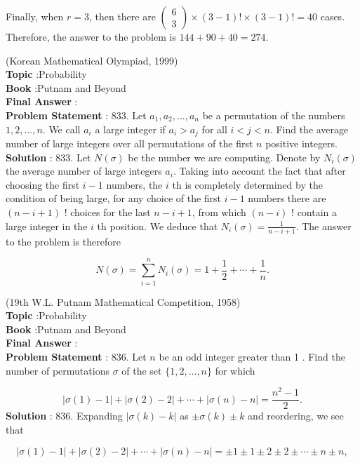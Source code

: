 \documentclass[10pt]{article}
\begin{document}
Finally, when $r=3$, then there are $\left(\begin{array}{l}6 \\ 3\end{array}\right) \times(3-1) ! \times(3-1) !=40$ cases. Therefore, the answer to the problem is $144+90+40=274$.

(Korean Mathematical Olympiad, 1999)
\\
\textbf{Topic} :Probability\\
\textbf{Book} :Putnam and Beyond\\
\textbf{Final Answer} :\\


\textbf{Problem Statement} :
833. Let $a_{1}, a_{2}, \ldots, a_{n}$ be a permutation of the numbers $1,2, \ldots, n$. We call $a_{i}$ a large integer if $a_{i}>a_{j}$ for all $i<j<n$. Find the average number of large integers over all permutations of the first $n$ positive integers.
\\
\textbf{Solution} :
833. Let $N(\sigma)$ be the number we are computing. Denote by $N_{i}(\sigma)$ the average number of large integers $a_{i}$. Taking into account the fact that after choosing the first $i-1$ numbers, the $i$ th is completely determined by the condition of being large, for any choice of the first $i-1$ numbers there are $(n-i+1)$ ! choices for the last $n-i+1$, from which $(n-i)$ ! contain a large integer in the $i$ th position. We deduce that $N_{i}(\sigma)=\frac{1}{n-i+1}$. The answer to the problem is therefore

$$
N(\sigma)=\sum_{i=1}^{n} N_{i}(\sigma)=1+\frac{1}{2}+\cdots+\frac{1}{n} .
$$

(19th W.L. Putnam Mathematical Competition, 1958)
\\
\textbf{Topic} :Probability\\
\textbf{Book} :Putnam and Beyond\\
\textbf{Final Answer} :\\


\textbf{Problem Statement} :
836. Let $n$ be an odd integer greater than 1 . Find the number of permutations $\sigma$ of the set $\{1,2, \ldots, n\}$ for which

$$
|\sigma(1)-1|+|\sigma(2)-2|+\cdots+|\sigma(n)-n|=\frac{n^{2}-1}{2} .
$$
\textbf{Solution} :
836. Expanding $|\sigma(k)-k|$ as $\pm \sigma(k) \pm k$ and reordering, we see that

$$
|\sigma(1)-1|+|\sigma(2)-2|+\cdots+|\sigma(n)-n|=\pm 1 \pm 1 \pm 2 \pm 2 \pm \cdots \pm n \pm n,
$$
\end{document}
